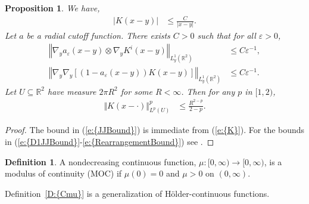 \documentclass[reqno,openright,11pt,twoside]{amsart}
\newtheorem{prop}[theorem]{Proposition}
\theoremstyle{definition}
\newtheorem{definition}[theorem]{Definition}
\numberwithin{equation}{section}
\begin{document}
\begin{prop}\label{P:KStarBounds}
	We have,
	\begin{align}\label{e:JJBound}
		{\left\vert{K(x - y)}\right\vert}
			&\le \frac{C}{{\left\vert{x - y}\right\vert}}.
	\end{align}
	Let $a$ be a radial cutoff function.
	There exists $C>0$ such that for all ${\ensuremath{\varepsilon}} > 0$,
	\begin{align}
		{\ensuremath{\left\Vert {{\ensuremath{\nabla}}_y a_{\ensuremath{\varepsilon}}(x - y) \otimes
		    {\ensuremath{\nabla}}_y K^i(x - y)} \right\Vert}}_{L^1_y({\ensuremath{{\ensuremath{\mathbb{{R}}}}}}^2)}
			&\le C {\ensuremath{\varepsilon}}^{-1},
								\label{e:D1JJBound} \\
		{\ensuremath{\left\Vert {{\ensuremath{\nabla}}_y {\ensuremath{\nabla}}_y {\ensuremath{\left[ {(1 - a_{\ensuremath{\varepsilon}}(x - y))
		    K(x - y)} \right]}}} \right\Vert}}_{L^1_y({\ensuremath{{\ensuremath{\mathbb{{R}}}}}}^2)}
			&\le C {\ensuremath{\varepsilon}}^{-1}.
								\label{e:D2KKBound}
	\end{align}
	Let $U \subseteq {\ensuremath{{\ensuremath{\mathbb{{R}}}}}}^2$ have measure $2 \pi R^2$ for some
	$R < {\ensuremath{\infty}}$.
	Then for any $p$ in $[1, 2)$,
	\begin{align}\label{e:RearrangementBound}
		{\ensuremath{\Vert {K(x - \cdot)} \Vert}}_{L^p(U)}^p
			&\le \frac{R^{2 - p}}{2 - p}.
	\end{align}
\end{prop}
\begin{proof}
    The bound in {(\ref{e:{JJBound}})} is immediate from {(\ref{e:{K}})}.
    For the bounds in {(\ref{e:{D1JJBound}}-\ref{e:{RearrangementBound}})}
    see \cite{AKLL2014}.
\end{proof}

\begin{definition}\label{D:MOC}
    	A nondecreasing continuous function,
    	$\mu \colon [0, {\ensuremath{\infty}}) \to [0, {\ensuremath{\infty}})$,
    	is a modulus of continuity (MOC)
    	if $\mu(0) = 0$ and $\mu > 0$ on $(0, {\ensuremath{\infty}})$. 
\end{definition}

{Definition~\ref{D:{Cmu}}} is a generalization of {H\"{o}lder\xspace}-continuous functions.
\end{document}
